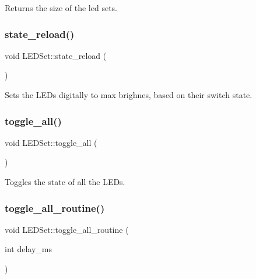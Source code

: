 Returns the size of the led sets. 

\mbox{\label{classLEDSet_a52d7a48f6639ce1df579e960e5a78890}} 
\subsubsection{\texorpdfstring{state\+\_\+reload()}{state\_reload()}}
{\footnotesize\ttfamily void L\+E\+D\+Set\+::state\+\_\+reload (\begin{DoxyParamCaption}{ }\end{DoxyParamCaption})\hspace{0.3cm}{\ttfamily [inline]}}



Sets the L\+E\+Ds digitally to max brighnes, based on their switch state. 

\mbox{\label{classLEDSet_a555f8e48ff0989647cba6de505db8a5d}} 
\subsubsection{\texorpdfstring{toggle\+\_\+all()}{toggle\_all()}}
{\footnotesize\ttfamily void L\+E\+D\+Set\+::toggle\+\_\+all (\begin{DoxyParamCaption}{ }\end{DoxyParamCaption})\hspace{0.3cm}{\ttfamily [inline]}}



Toggles the state of all the L\+E\+Ds. 

\mbox{\label{classLEDSet_a5ba8bc8d99267bcaa579fea860ebe7d0}} 
\subsubsection{\texorpdfstring{toggle\+\_\+all\+\_\+routine()}{toggle\_all\_routine()}}
{\footnotesize\ttfamily void L\+E\+D\+Set\+::toggle\+\_\+all\+\_\+routine (\begin{DoxyParamCaption}\item[{int}]{delay\+\_\+ms }\end{DoxyParamCaption})\hspace{0.3cm}{\ttfamily [inline]}}

